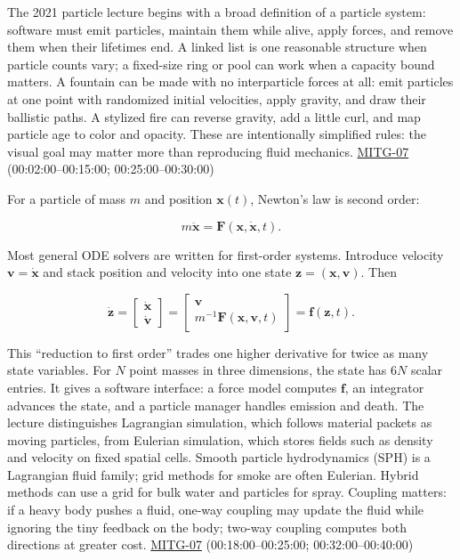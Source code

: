 The 2021 particle lecture begins with a broad definition of a particle system: software must emit particles, maintain them while alive, apply forces, and remove them when their lifetimes end. A linked list is one reasonable structure when particle counts vary; a fixed-size ring or pool can work when a capacity bound matters. A fountain can be made with no interparticle forces at all: emit particles at one point with randomized initial velocities, apply gravity, and draw their ballistic paths. A stylized fire can reverse gravity, add a little curl, and map particle age to color and opacity. These are intentionally simplified rules: the visual goal may matter more than reproducing fluid mechanics. \hyperref[04-visual-computing-ii-ch036]{MITG-07} (00:02:00--00:15:00; 00:25:00--00:30:00)

For a particle of mass \(m\) and position \(\boldsymbol{x}(t)\), Newton's law is second order:

\[
m\ddot{\boldsymbol{x}}=\boldsymbol{F}(\boldsymbol{x},\dot{\boldsymbol{x}},t).
\]

Most general ODE solvers are written for first-order systems. Introduce velocity \(\boldsymbol{v}=\dot{\boldsymbol{x}}\) and stack position and velocity into one state \(\boldsymbol{z}=(\boldsymbol{x},\boldsymbol{v})\). Then

\[
\dot{\boldsymbol{z}}=
\begin{bmatrix}\dot{\boldsymbol{x}}\\\dot{\boldsymbol{v}}\end{bmatrix}
=\begin{bmatrix}\boldsymbol{v}\\m^{-1}\boldsymbol{F}(\boldsymbol{x},\boldsymbol{v},t)\end{bmatrix}
=\boldsymbol{f}(\boldsymbol{z},t).
\]

This ``reduction to first order'' trades one higher derivative for twice as many state variables. For \(N\) point masses in three dimensions, the state has \(6N\) scalar entries. It gives a software interface: a force model computes \(\boldsymbol{f}\), an integrator advances the state, and a particle manager handles emission and death. The lecture distinguishes Lagrangian simulation, which follows material packets as moving particles, from Eulerian simulation, which stores fields such as density and velocity on fixed spatial cells. Smooth particle hydrodynamics (SPH) is a Lagrangian fluid family; grid methods for smoke are often Eulerian. Hybrid methods can use a grid for bulk water and particles for spray. Coupling matters: if a heavy body pushes a fluid, one-way coupling may update the fluid while ignoring the tiny feedback on the body; two-way coupling computes both directions at greater cost. \hyperref[04-visual-computing-ii-ch036]{MITG-07} (00:18:00--00:25:00; 00:32:00--00:40:00)

